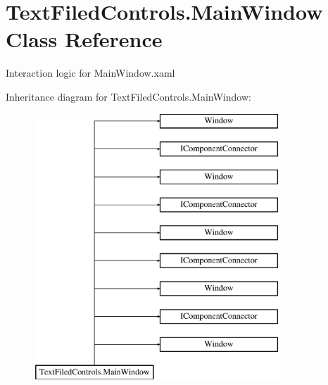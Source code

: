\hypertarget{class_text_filed_controls_1_1_main_window}{}\section{Text\+Filed\+Controls.\+Main\+Window Class Reference}
\label{class_text_filed_controls_1_1_main_window}


Interaction logic for Main\+Window.\+xaml  


Inheritance diagram for Text\+Filed\+Controls.\+Main\+Window\+:\begin{figure}[H]
\begin{center}
\leavevmode
\includegraphics[height=10.000000cm]{d9/ddd/class_text_filed_controls_1_1_main_window}
\end{center}
\end{figure}
